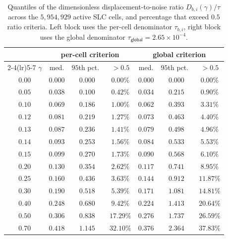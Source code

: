 \documentclass[sigconf, review]{acmart}
\newcommand{\NF}{\tau}
\newcommand{\NFG}{\tau_{\textsf{global}}}
\begin{document}
\begin{table}[t]
\centering
\caption{Quantiles of the dimensionless displacement-to-noise
ratio $D_{b, i}(\gamma) / \NF$ across the $5{,}954{,}929$
active SLC cells, and percentage that exceed $0.5$ ratio criteria.  
Left block uses the per-cell denominator
$\NF_{b, i}$, right block uses the global denominator
$\NFG = 2.65 \times 10^{-4}$. }
\label{tab:gamma-noise-floor}
\small
\setlength{\tabcolsep}{4pt}
\begin{tabular}{c|ccc|ccc}
\toprule
& \multicolumn{3}{c}{per-cell criterion}
& \multicolumn{3}{c}{global criterion} \\
\cmidrule(lr){2-4}\cmidrule(lr){5-7}
$\gamma$
 & med. & $95$th pct.\ & $>\!0.5$
 & med. & $95$th pct.\ & $>\!0.5$ \\
\midrule
$0.00$ & $0.000$ & $0.000$ & $0.00\%$ & $0.000$ & $0.000$ & $0.00\%$ \\
$0.05$ & $0.038$ & $0.100$ & $0.42\%$ & $0.034$ & $0.215$ & $0.90\%$ \\
$0.10$ & $0.069$ & $0.186$ & $1.00\%$ & $0.062$ & $0.393$ & $3.31\%$ \\
$0.12$ & $0.081$ & $0.219$ & $1.27\%$ & $0.073$ & $0.463$ & $4.40\%$ \\
$0.13$ & $0.087$ & $0.236$ & $1.41\%$ & $0.079$ & $0.498$ & $4.96\%$ \\
$0.14$ & $0.093$ & $0.253$ & $1.56\%$ & $0.084$ & $0.533$ & $5.53\%$ \\
$0.15$ & $0.099$ & $0.270$ & $1.73\%$ & $0.090$ & $0.568$ & $6.10\%$ \\
\rowcolor{gray!15} 
$0.20$ & $0.130$ & $0.354$ & $2.62\%$
       & $0.117$ & $0.741$ & $8.95\%$ \\
$0.25$ & $0.160$ & $0.436$ & $3.63\%$ & $0.144$ & $0.912$ & $11.87\%$ \\
$0.30$ & $0.190$ & $0.518$ & $5.39\%$ & $0.171$ & $1.081$ & $14.81\%$ \\
$0.40$ & $0.248$ & $0.680$ & $9.42\%$ & $0.224$ & $1.413$ & $20.64\%$ \\
$0.50$ & $0.306$ & $0.838$ & $17.29\%$ & $0.276$ & $1.737$ & $26.59\%$ \\
$0.70$ & $0.418$ & $1.145$ & $32.10\%$ & $0.376$ & $2.364$ & $37.83\%$ \\
\bottomrule
\end{tabular}
\end{table}
\end{document}
